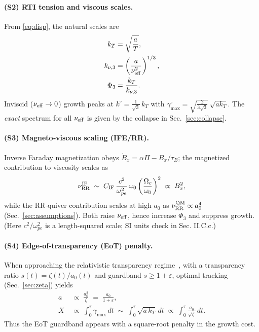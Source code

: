 \documentclass[aps,pre,twocolumn,showpacs,superscriptaddress]{revtex4-2}
\theoremstyle{definition}
\begin{document}
\paragraph{(S2) RTI tension and viscous scales.}
From \eqref{eq:disp}, the natural scales are
\begin{align}
k_T&=\sqrt{\frac{a}{T}},\label{eq:S2}\\
k_{\nu,3}&=\left(\frac{a}{\nu_{\rm eff}^2}\right)^{1/3},\nonumber\\
\Phi_3&=\frac{k_T}{k_{\nu,3}}.\nonumber
\end{align}
Inviscid ($\nu_{\rm eff}\to 0$) growth peaks at $k^\circ=\frac{1}{\sqrt{3}}\,k_T$ with
$\gamma_{\max}^\circ=\sqrt{\frac{2}{3\sqrt{3}}}\,\sqrt{a k_T}$.
The \emph{exact} spectrum for all $\nu_{\rm eff}$ is given by the collapse in Sec.~\ref{sec:collapse}.

\paragraph{(S3) Magneto‑viscous scaling (IFE/RR).}
Inverse Faraday magnetization obeys $\dot B_x=\alpha \Pi - B_x/\tau_B$; the magnetized contribution to viscosity scales as
\begin{equation}
\nu^{\rm IF}_{\rm RR}\;\sim\; C_{\rm IF}\,\frac{c^2}{\omega_{pe}^2}\,\omega_0\left(\frac{\Omega_c}{\omega_0}\right)^2
\;\propto\; B_x^2, \label{eq:S3}
\end{equation}
while the RR‑quiver contribution scales at high $a_0$ as
$\nu^{\rm QM}_{\rm RR}\propto a_0^4$ (Sec.~\ref{sec:assumptions}). Both raise $\nu_{\rm eff}$, hence increase $\Phi_3$ and suppress growth. (Here $c^2/\omega_{pe}^2$ is a length-squared scale; SI units check in Sec. II.C.c.)

\paragraph{(S4) Edge‑of‑transparency (EoT) penalty.}
When approaching the relativistic transparency regime~\cite{Palaniyappan2012NatPhys}, with a transparency ratio $s(t)=\zeta(t)/a_0(t)$ and guardband $s\ge 1+\varepsilon$, optimal tracking (Sec.~\ref{sec:zeta}) yields
\begin{align}
a &\;\propto\; \frac{a_0^2}{\zeta}\;=\;\frac{a_0}{1+\varepsilon},\label{eq:S4}\\
X&\;\propto\;\int_0^\tau\gamma_{\max}\,dt\;\sim\;\int_0^\tau \sqrt{a\,k_T}\,dt\;\propto\;\int_0^\tau \frac{a_0}{\sqrt{\zeta}}\,dt.\nonumber
\end{align}
Thus the EoT guardband appears with a square‑root penalty in the growth cost.
\end{document}
